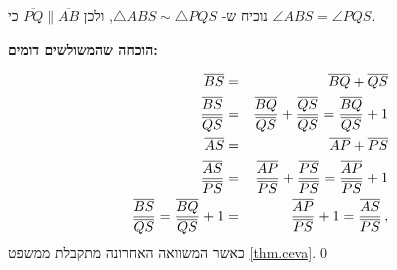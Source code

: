 נוכיח ש-%
$\triangle ABS\sim\triangle PQS$,
ולכן
$\overline{PQ}\|\overline{AB}$
כי
$\angle ABS = \angle PQS$.


\textbf{הוכחה שהמשולשים דומים:}

\begin{eqnarray*}
\overline{BS}&=&\overline{BQ}+\overline{QS}\\
\displaystyle\frac{\overline{BS}}{\overline{QS}}&=&\displaystyle\frac{\overline{BQ}}{\overline{QS}}+\displaystyle\frac{\overline{QS}}{\overline{QS}} = \displaystyle\frac{\overline{BQ}}{\overline{QS}}+1\\
\overline{AS}&=&\overline{AP}+\overline{PS}\\
\displaystyle\frac{\overline{AS}}{\overline{PS}} &=& \displaystyle\frac{\overline{AP}}{\overline{PS}} + \displaystyle\frac{\overline{PS}}{\overline{PS}} = \displaystyle\frac{\overline{AP}}{\overline{PS}} + 1\\
\displaystyle\frac{\overline{BS}}{\overline{QS}}=\displaystyle\frac{\overline{BQ}}{\overline{QS}}+1&=&\displaystyle\frac{\overline{AP}}{\overline{PS}} + 1=\displaystyle\frac{\overline{AS}}{\overline{PS}}\,,
\end{eqnarray*}
כאשר המשוואה האחרונה מתקבלת ממשפט
\ref{thm.ceva}.\qed

